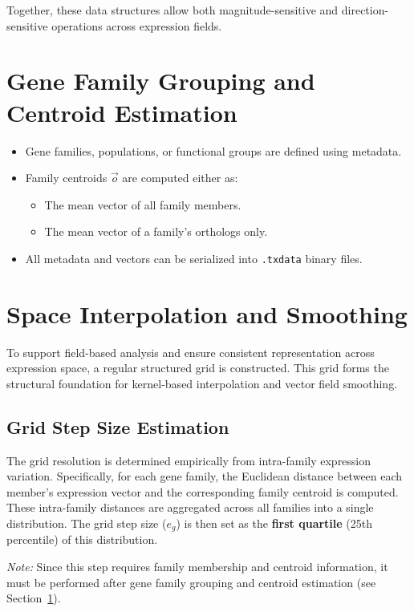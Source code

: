 \documentclass{article}
\begin{document}
Together, these data structures allow both magnitude-sensitive and direction-sensitive operations across expression fields.

\section{Gene Family Grouping and Centroid Estimation}
\label{sec:centroid_estimation}
\begin{itemize}
    \item Gene families, populations, or functional groups are defined using
      metadata.
    \item Family centroids \( \vec{o} \) are computed either as:
    \begin{itemize}
        \item The mean vector of all family members.
        \item The mean vector of a family's orthologs only.
    \end{itemize}
    \item All metadata and vectors can be serialized into \texttt{.txdata}
      binary files.
\end{itemize}

\section{Space Interpolation and Smoothing}
\label{sec:interpolation}

To support field-based analysis and ensure consistent representation across expression space, a regular structured grid is constructed. This grid forms the structural foundation for kernel-based interpolation and vector field smoothing.

\subsection{Grid Step Size Estimation}

The grid resolution is determined empirically from intra-family expression variation. Specifically, for each gene family, the Euclidean distance between each member's expression vector and the corresponding family centroid is computed. These intra-family distances are aggregated across all families into a single distribution. The grid step size ($e_g$) is then set as the \textbf{first quartile} (25th percentile) of this distribution.

\textit{Note:} Since this step requires family membership and centroid information, it must be performed after gene family grouping and centroid estimation (see Section~\ref{sec:centroid_estimation}).
\end{document}
